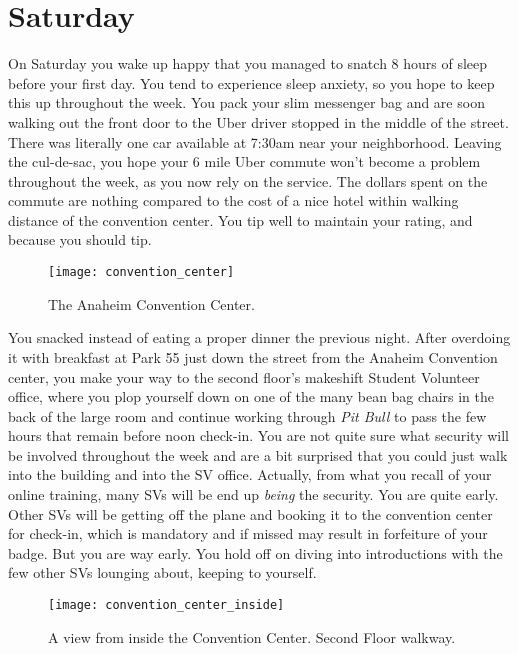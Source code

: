 \documentclass[../main.tex]{subfiles}
\begin{document}
\section{Saturday}

On Saturday you wake up happy that you managed to snatch 8 hours of sleep before your first day. You tend to experience sleep anxiety, so you hope to keep this up throughout the week. You pack your slim messenger bag and are soon walking out the front door to the Uber driver stopped in the middle of the street. There was literally one car available at 7:30am near your neighborhood. Leaving the cul-de-sac, you hope your 6 mile Uber commute won't become a problem throughout the week, as you now rely on the service. The dollars spent on the commute are nothing compared to the cost of a nice hotel within walking distance of the convention center. You tip well to maintain your rating, and because you should tip.

\begin{figure}[h]
	\centering
	\texttt{[image: convention\_center]}
	\caption*{The Anaheim Convention Center.}
\end{figure}

You snacked instead of eating a proper dinner the previous night. After overdoing it with breakfast at Park 55 just down the street from the Anaheim Convention center, you make your way to the second floor's makeshift Student Volunteer office, where you plop yourself down on one of the many bean bag chairs in the back of the large room and continue working through \textit{Pit Bull} to pass the few hours that remain before noon check-in. You are not quite sure what security will be involved throughout the week and are a bit surprised that you could just walk into the building and into the SV office. Actually, from what you recall of your online training, many SVs will be end up \textit{being} the security. You are quite early. Other SVs will be getting off the plane and booking it to the convention center for check-in, which is mandatory and if missed may result in forfeiture of your badge. But you are way early. You hold off on diving into introductions with the few other SVs lounging about, keeping to yourself.

\begin{figure}[h]
	\centering
	\texttt{[image: convention\_center\_inside]}
	\caption*{A view from inside the Convention Center. Second Floor walkway.}
\end{figure}
\end{document}
